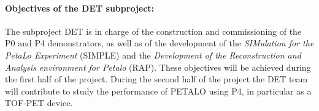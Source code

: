 \paragraph{Objectives of the DET subproject:}

The subproject DET is in charge of the construction and commissioning of the P0 and P4 demonstrators, as well as of the development of the {\em SIMulation for the PetaLo Experiment} (SIMPLE) and the {\em Development of the Reconstruction and Analysis environment for Petalo} (RAP). These objectives will be achieved during the first half of the project. During the second half of the project the DET team will contribute to study the performance of PETALO using P4, in particular as a TOF-PET device. 

%
%
%
%

